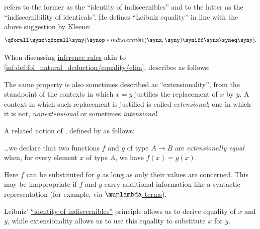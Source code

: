 \begin{remark}
  \textcite[\S 9.1.4]{Mimram2020ProgramEqualsProof} refers to the former as the \enquote{identity of indiscernibles} and to the latter as the \enquote{indiscernibility of identicals}. He defines \enquote{Leibniz equality} in line with the above suggestion by Kleene:
  \begin{equation}\label{eq:rem:identity_of_indiscernibles/bi}
    \qforall \synx \qforall \syny (\synop*{indiscernible}(\synx, \syny) \syniff \synx \syneq \syny).
  \end{equation}
\end{remark}

\begin{concept}\label{con:extensionality}
  When discussing \hyperref[def:inference_rule]{inference rules} akin to \ref{inf:def:fol_natural_deduction/equality/elim}, \textcite[164]{Kleene2002Logic} describes  as follows:
  \begin{displayquote}
    The same property is also sometimes described as \enquote{extensionality}, from the standpoint of the contexts in which \( x = y \) justifies the replacement of \( x \) by \( y \). A context in which such replacement is justified is called \textit{extensional}; one in which it is not, \textit{nonextensional} or sometimes \textit{intensional}.
  \end{displayquote}

  A related notion of , defined by \textcite[407]{Mimram2020ProgramEqualsProof} as follows:
  \begin{displayquote}
    \ldots we declare that two functions \( f \) and \( g \) of type \( A \to B \) are \textit{extensionally equal} when, for every element \( x \) of type \( A \), we have \( f(x) = g(x) \).
  \end{displayquote}

  Here \( f \) can be substituted for \( g \) as long as only their values are concerned. This may be inappropriate if \( f \) and \( g \) carry additional information like a syntactic representation (for example, via \hyperref[def:lambda_term]{\( \muplambda \)-terms}).
\end{concept}
\begin{comments}
  \item Leibniz' \hyperref[rem:identity_of_indiscernibles]{\enquote{identity of indiscernibles}} principle allows us to derive equality of \( x \) and \( y \), while extensionality allows us to use this equality to substitute \( x \) for \( y \).
\end{comments}

